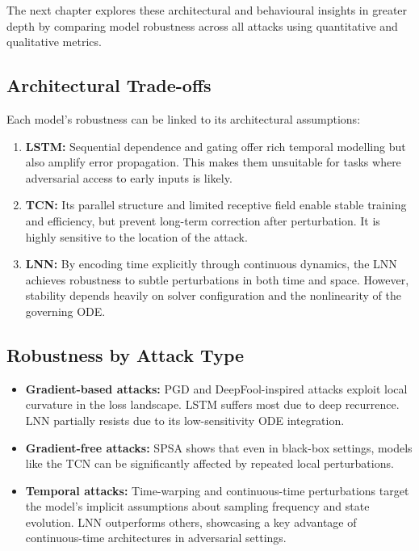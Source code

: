 \vspace{1em}
\noindent The next chapter explores these architectural and behavioural insights in greater depth by comparing model robustness across all attacks using quantitative and qualitative metrics.


\subsection*{Architectural Trade-offs}

Each model's robustness can be linked to its architectural assumptions:
\begin{enumerate}
    \item \textbf{LSTM:} Sequential dependence and gating offer rich temporal modelling but also amplify error propagation. This makes them unsuitable for tasks where adversarial access to early inputs is likely.
    \item \textbf{TCN:} Its parallel structure and limited receptive field enable stable training and efficiency, but prevent long-term correction after perturbation. It is highly sensitive to the location of the attack.
    \item \textbf{LNN:} By encoding time explicitly through continuous dynamics, the LNN achieves robustness to subtle perturbations in both time and space. However, stability depends heavily on solver configuration and the nonlinearity of the governing ODE.
\end{enumerate}

\subsection*{Robustness by Attack Type}

\begin{itemize}
    \item \textbf{Gradient-based attacks:} PGD and DeepFool-inspired attacks exploit local curvature in the loss landscape. LSTM suffers most due to deep recurrence. LNN partially resists due to its low-sensitivity ODE integration.
    \item \textbf{Gradient-free attacks:} SPSA shows that even in black-box settings, models like the TCN can be significantly affected by repeated local perturbations.
    \item \textbf{Temporal attacks:} Time-warping and continuous-time perturbations target the model's implicit assumptions about sampling frequency and state evolution. LNN outperforms others, showcasing a key advantage of continuous-time architectures in adversarial settings.
\end{itemize}

